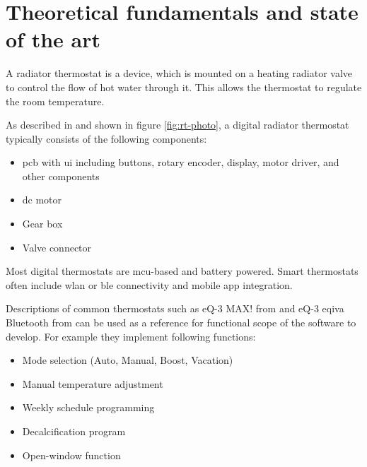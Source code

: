 %
%

\chapter{Theoretical fundamentals and state of the art}
\label{chap:Theoretical fundamentals and state of the art}
%
A radiator thermostat is a device, which is mounted on a heating radiator valve to control the flow of hot water through it. This allows the thermostat to regulate the room temperature.

As described in \cite{ELVjournal.2012} and shown in figure \ref{fig:rt-photo}, a digital radiator thermostat typically consists of the following components:

\begin{itemize}
	\item \ac{pcb} with \ac{ui} including buttons, rotary encoder, display, motor driver, and other components
	\item \ac{dc} motor
	\item Gear box
	\item Valve connector
\end{itemize}

Most digital thermostats are \ac{mcu}-based and battery powered. Smart thermostats often include \ac{wlan} or \ac{ble} connectivity and mobile app integration.

Descriptions of common thermostats such as eQ-3 MAX! from \cite{ELVjournal.2012} and eQ-3 eqiva Bluetooth from \cite{eQ3AG.05.2018} can be used as a reference for functional scope of the software to develop. For example they implement following functions:

\begin{itemize}
	\item Mode selection (Auto, Manual, Boost, Vacation)
	\item Manual temperature adjustment
	\item Weekly schedule programming
	\item Decalcification program
	\item Open-window function
\end{itemize}

